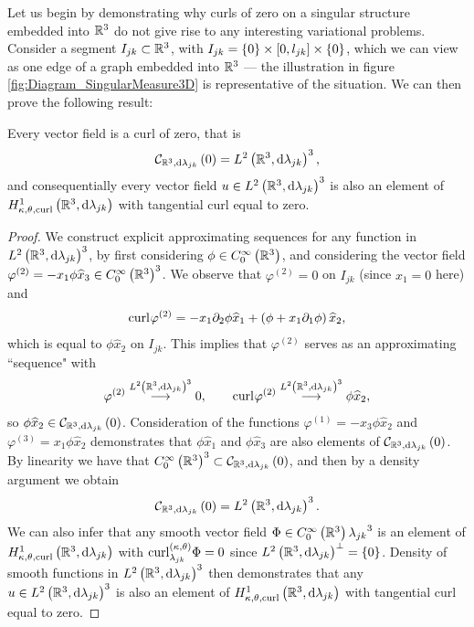 Let us begin by demonstrating why curls of zero on a singular structure embedded into $\mathbb{R}^3$ do not give rise to any interesting variational problems.
Consider a segment $I_{jk}\subset\mathbb{R}^3$, with $I_{jk} = \left\{ 0 \right\}\times\left[ 0,l_{jk} \right]\times\left\{ 0 \right\}$, which we can view as one edge of a graph embedded into $\mathbb{R}^3$ --- the illustration in figure \ref{fig:Diagram_SingularMeasure3D} is representative of the situation.
We can then prove the following result:
\begin{prop} \label{prop:3DGraph-CurlsAreZero}
	Every vector field is a curl of zero, that is
	\begin{align*}
		\mathcal{C}_{ \mathbb{R}^3, \mathrm{d}\lambda_{jk}}\left( 0 \right) = L^{2}\left( \mathbb{R}^3,\mathrm{d} \lambda_{jk} \right)^3,
	\end{align*}
	and consequentially every vector field $u\in L^{2}\left( \mathbb{R}^3,\mathrm{d} \lambda_{jk} \right)^3$ is also an element of $H^1_{\kappa,\theta,\mathrm{curl}}\left( \mathbb{R}^3, \mathrm{d}\lambda_{jk} \right)$ with tangential curl equal to zero.
\end{prop}
\begin{proof}
	We construct explicit approximating sequences for any function in $L^{2}\left( \mathbb{R}^3,\mathrm{d} \lambda_{jk} \right)^3$, by first considering $\phi\in C^{\infty}_{0}\left( \mathbb{R}^3 \right)$, and considering the vector field $\varphi^{(2)} = -x_1\phi\widehat{x}_3\in C^{\infty}_{0}\left( \mathbb{R}^3 \right)^3$.
	We observe that $\varphi^{(2)}=0$ on $I_{jk}$ (since $x_1=0$ here) and 
	\begin{align*}
		\mathrm{curl}_{}\varphi^{(2)} = -x_1\partial_2\phi\widehat{x}_1 + \left( \phi + x_1\partial_1\phi \right)\widehat{x}_2,
	\end{align*}
	which is equal to $\phi\widehat{x}_2$ on $I_{jk}$.
	This implies that $\varphi^{(2)}$ serves as an approximating ``sequence" with
	\begin{align*}
		\varphi^{(2)} \overset{L^{2}\left( \mathbb{R}^3,\mathrm{d} \lambda_{jk} \right)^3}{\longrightarrow} 0, 
		\qquad
		\mathrm{curl}_{}\varphi^{(2)} \overset{L^{2}\left( \mathbb{R}^3,\mathrm{d} \lambda_{jk} \right)^3}{\longrightarrow} \phi\widehat{x}_2,
	\end{align*}
	so $\phi\widehat{x}_2\in\mathcal{C}_{ \mathbb{R}^3, \mathrm{d}\lambda_{jk}}\left( 0 \right)$.
	Consideration of the functions $\varphi^{(1)} = -x_3\phi\widehat{x}_2$ and $\varphi^{(3)}=x_1\phi\widehat{x}_2$ demonstrates that $\phi\widehat{x}_1$ and $\phi\widehat{x}_3$ are also elements of $\mathcal{C}_{ \mathbb{R}^3, \mathrm{d}\lambda_{jk}}\left( 0 \right)$.
	By linearity we have that $C^{\infty}_{0}\left( \mathbb{R}^3 \right)^3\subset\mathcal{C}_{ \mathbb{R}^3, \mathrm{d}\lambda_{jk}}\left( 0 \right)$, and then by a density argument we obtain
	\begin{align*}
		\mathcal{C}_{ \mathbb{R}^3, \mathrm{d}\lambda_{jk}}\left( 0 \right) = L^{2}\left( \mathbb{R}^3,\mathrm{d} \lambda_{jk} \right)^3.
	\end{align*}
	We can also infer that any smooth vector field $\Phi\in C^{\infty}_{0}\left( \mathbb{R}^3 \right){\lambda_{jk}}^3$ is an element of $H^1_{\kappa,\theta,\mathrm{curl}}\left( \mathbb{R}^3, \mathrm{d}\lambda_{jk} \right)$ with $\mathrm{curl}_{\lambda_{jk}}^{\left( \kappa, \theta \right)}\Phi = 0$ since $L^{2}\left( \mathbb{R}^3,\mathrm{d} \lambda_{jk} \right)^{\perp} = \left\{ 0 \right\}$.
	Density of smooth functions in $L^{2}\left( \mathbb{R}^3,\mathrm{d} \lambda_{jk} \right)^3$ then demonstrates that any $u\in L^{2}\left( \mathbb{R}^3,\mathrm{d} \lambda_{jk} \right)^3$ is also an element of $H^1_{\kappa,\theta,\mathrm{curl}}\left( \mathbb{R}^3, \mathrm{d}\lambda_{jk} \right)$ with tangential curl equal to zero.
\end{proof}
